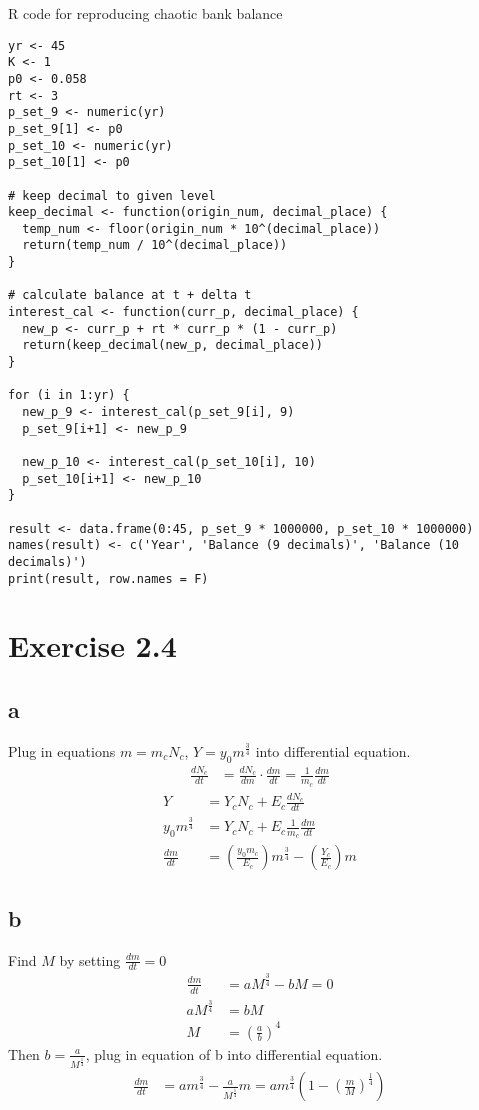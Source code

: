\documentclass[11pt,letterpaper]{article}
\begin{document}
 \noindent R code for reproducing chaotic bank balance
\begin{verbatim}
yr <- 45
K <- 1
p0 <- 0.058
rt <- 3
p_set_9 <- numeric(yr)
p_set_9[1] <- p0
p_set_10 <- numeric(yr)
p_set_10[1] <- p0

# keep decimal to given level
keep_decimal <- function(origin_num, decimal_place) {
  temp_num <- floor(origin_num * 10^(decimal_place))
  return(temp_num / 10^(decimal_place))
}

# calculate balance at t + delta t
interest_cal <- function(curr_p, decimal_place) {
  new_p <- curr_p + rt * curr_p * (1 - curr_p)
  return(keep_decimal(new_p, decimal_place))
}

for (i in 1:yr) {
  new_p_9 <- interest_cal(p_set_9[i], 9)
  p_set_9[i+1] <- new_p_9
  
  new_p_10 <- interest_cal(p_set_10[i], 10)
  p_set_10[i+1] <- new_p_10
}

result <- data.frame(0:45, p_set_9 * 1000000, p_set_10 * 1000000)
names(result) <- c('Year', 'Balance (9 decimals)', 'Balance (10 decimals)')
print(result, row.names = F)
\end{verbatim}
 
\section*{Exercise 2.4}
\subsection*{a}
\noindent Plug in equations $m = m_c N_c$, $Y = y_0 m^{\frac{3}{4}}$ into differential equation.
\begin{align*}
\frac{dN_c}{dt} &= \frac{d N_c}{d m} \cdot \frac{d m}{dt} = \frac{1}{m_c} \frac{dm}{dt}
\end{align*}
\begin{align*}
Y &= Y_c N_c + E_c \frac{dN_c}{dt} \\
y_0 m^{\frac{3}{4}} &= Y_c N_c + E_c \frac{1}{m_c} \frac{dm}{dt} \\
\frac{dm}{dt} &= (\frac{y_0 m_c}{E_c}) m^{\frac{3}{4}} - (\frac{Y_c}{E_c})m
\end{align*}
 
\subsection*{b}
\noindent Find $M$ by setting $\frac{dm}{dt} = 0$
\begin{align*}
\frac{dm}{dt} &= aM^{\frac{3}{4}} - bM = 0 \\
aM^{\frac{3}{4}} &= bM \\
M &= (\frac{a}{b})^{4}
\end{align*}
\noindent Then $b = \frac{a}{M^{\frac{1}{4}}}$, plug in equation of b into differential equation.
\begin{align*}
\frac{dm}{dt} &= a m^{\frac{3}{4}} - \frac{a}{M^{\frac{1}{4}}} m = a m^{\frac{3}{4}}(1 - (\frac{m}{M})^{\frac{1}{4}})
\end{align*}
\end{document}
